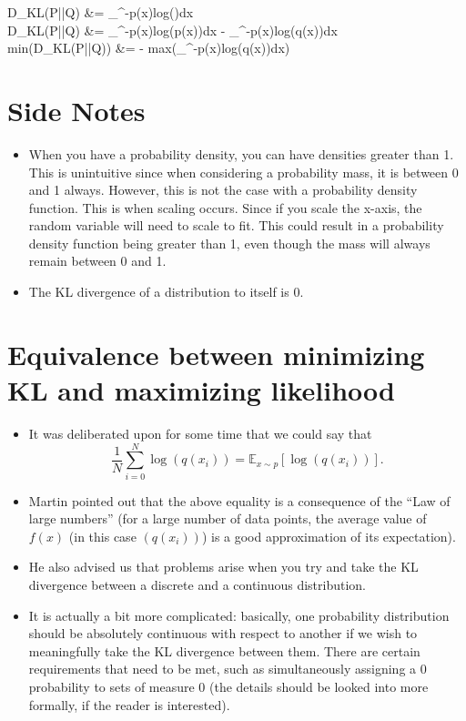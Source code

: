 \documentclass{article}
\begin{document}
\begin{center}
	\begin{flalign}
	D_{KL}(P||Q) &= \int_{\infty}^{-\infty}p(x)log()dx \\
	D_{KL}(P||Q) &= \int_{\infty}^{-\infty}p(x)log(p(x))dx - \int_{\infty}^{-\infty}p(x)log(q(x))dx \\
	min(D_{KL}(P||Q)) &= - max(\int_{\infty}^{-\infty}p(x)log(q(x))dx)
	\end{flalign}
\end{center} 

\section{Side Notes}
\begin{itemize}
	\item When you have a probability density, you can have densities greater than 1. This is unintuitive since when considering a probability mass, it is between 0 and 1 always. However, this is not the case with a probability density function. This is when scaling occurs. Since if you scale the x-axis, the random variable will need to scale to fit. This could result in a probability density function being greater than 1, even though the mass will always remain between 0 and 1.
	\item The KL divergence of a distribution to itself is 0.
\end{itemize} 

\section{Equivalence between minimizing KL and maximizing likelihood}

\begin{itemize}
	\item It was deliberated upon for some time that we could say that
	\begin{equation}
	\frac{1}{N}\sum_{i=0}^N \log (q(x_i)) = \mathbb{E}_{x \sim p}[\log (q(x_i))].
	\end{equation}
	
	\item Martin pointed out that the above equality is a consequence of the ``Law of large numbers'' (for a large number of data points, the average value of $f(x)$ (in this case $(q(x_i))$) is a good approximation of its expectation).
	
	\item He also advised us that problems arise when you try and take the KL divergence between a discrete and a continuous distribution.
	
	\item It is actually a bit more	complicated: basically, one probability distribution should be absolutely continuous with respect to another if we wish to meaningfully take the KL divergence between them. There are certain requirements that need to be met, such as simultaneously assigning a 0 probability to sets of measure 0 (the details should
	be looked into more formally, if the reader is interested).
\end{itemize}
\end{document}
